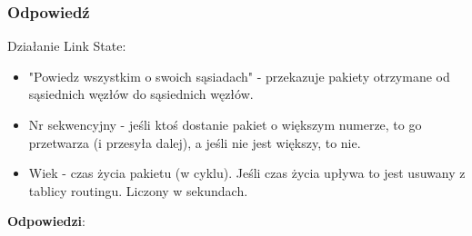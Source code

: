 		\subsubsection{Odpowiedź}
			Działanie Link State:
			\begin{itemize}
				\item "Powiedz wszystkim o swoich sąsiadach" - przekazuje pakiety otrzymane od sąsiednich węzłów do sąsiednich węzłów.
				\item Nr sekwencyjny - jeśli ktoś dostanie pakiet o większym numerze, to go przetwarza (i przesyła dalej), a jeśli nie jest większy, to nie.
				\item Wiek - czas życia pakietu (w cyklu). Jeśli czas życia upływa to jest usuwany z tablicy routingu. Liczony w sekundach.
			\end{itemize}
\newpage
			\textbf{Odpowiedzi}:
